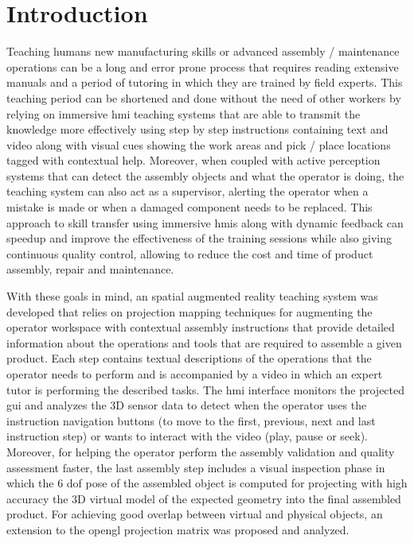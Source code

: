 \section{Introduction}\label{sec:introduction}

Teaching humans new manufacturing skills or advanced assembly / maintenance operations can be a long and error prone process that requires reading extensive manuals and a period of tutoring in which they are trained by field experts. This teaching period can be shortened and done without the need of other workers by relying on immersive \gls{hmi} teaching systems that are able to transmit the knowledge more effectively using step by step instructions containing text and video along with visual cues showing the work areas and pick / place locations tagged with contextual help. Moreover, when coupled with active perception systems that can detect the assembly objects and what the operator is doing, the teaching system can also act as a supervisor, alerting the operator when a mistake is made or when a damaged component needs to be replaced. This approach to skill transfer using immersive \glspl{hmi} along with dynamic feedback can speedup and improve the effectiveness of the training sessions while also giving continuous quality control, allowing to reduce the cost and time of product assembly, repair and maintenance.

With these goals in mind, an spatial augmented reality teaching system was developed that relies on projection mapping techniques for augmenting the operator workspace with contextual assembly instructions that provide detailed information about the operations and tools that are required to assemble a given product. Each step contains textual descriptions of the operations that the operator needs to perform and is accompanied by a video in which an expert tutor is performing the described tasks. The \gls{hmi} interface monitors the projected \gls{gui} and analyzes the 3D sensor data to detect when the operator uses the instruction navigation buttons (to move to the first, previous, next and last instruction step) or wants to interact with the video (play, pause or seek). Moreover, for helping the operator perform the assembly validation and quality assessment faster, the last assembly step includes a visual inspection phase in which the 6 \gls{dof} pose of the assembled object is computed for projecting with high accuracy the 3D virtual model of the expected geometry into the final assembled product. For achieving good overlap between virtual and physical objects, an extension to the \gls{opengl} projection matrix was proposed and analyzed.

